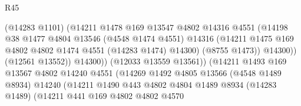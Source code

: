 \begin{lexlean}{R45}
\begin{coremodule}
                                        (@14283 @1101)
                                        (@14211
                                          @1478
                                          @169
                                          @13547
                                          @4802
                                          @14316
                                          @4551
                                          (@14198
                                            @38
                                            @1477
                                            @4804
                                            @13546
                                            (@4548 @1474 @4551)
                                            @14316
                                            (@14211
                                              @1475
                                              @169
                                              @4802
                                              @4802
                                              @1474
                                              @4551
                                              (@14283 @1474)
                                              @14300)
                                            (@8755 @1473))
                                          @14300))
                                      (@12561 @13552))
                                    @14300))
                                (@12033 @13559 @13561))
                              (@14211
                                @1493
                                @169
                                @13567
                                @4802
                                @14240
                                @4551
                                (@14269
                                  @1492
                                  @4805
                                  @13566
                                  (@4548 @1489 @8934)
                                  @14240
                                  (@14211
                                    @1490
                                    @443
                                    @4802
                                    @4804
                                    @1489
                                    @8934
                                    (@14283 @1489)
                                    (@14211
                                      @441
                                      @169
                                      @4802
                                      @4802
                                      @4570

\end{coremodule}
\end{lexlean}
